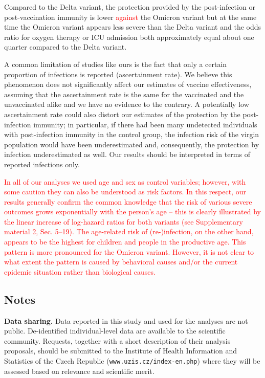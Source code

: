 \documentclass[a4paper,12pt]{article}
\newcommand{\new}[1]{\textcolor{red}{#1}}
\begin{document}
Compared to the Delta variant, the protection provided by the post-infection or post-vaccination immunity is lower \new{against} the Omicron variant but at the same time the Omicron variant appears less severe than the Delta variant and the odds ratio for oxygen therapy or ICU admission both approximately equal about one quarter compared to the Delta variant.

A common limitation of studies like ours is the fact that only a certain proportion of infections is reported (ascertainment rate). We believe this phenomenon does not  significantly affect our estimates of vaccine effectiveness, assuming that the ascertainment rate is the same for the vaccinated and the unvaccinated alike and we have no evidence to the contrary. A potentially low ascertainment rate could also distort our estimates of the protection by the post-infection immunity; in particular, if there had been many undetected individuals with post-infection immunity in the control group, the infection risk of the virgin population would have been underestimated and, consequently, the protection by infection underestimated as well. Our results should be interpreted in terms of reported infections only. 

\new{In all of our analyses we used age and sex as control variables; however, with some caution they can  also be understood as risk factors. In this respect, our results generally confirm the common knowledge that the risk of various severe outcomes grows exponentially with the person's age -- this is clearly illustrated by the linear increase of log-hazard ratios for both variants (see Supplementary material 2, Sec. 5--19). The age-related risk of (re-)infection, on the other hand, appears to be the highest for children and people in the productive age. This pattern is more pronounced for the Omicron variant. However, it is not clear to what extent  the pattern is caused by behavioral causes and/or the current epidemic situation rather than biological causes.}


\subsection*{Notes}

{\bf Data sharing.} 
Data reported in this study and used for the analyses are not public. De-identified individual-level data are available to the scientific community. Requests, together with a short description of their analysis proposals, should be submitted to the Institute of Health Information and Statistics of the Czech Republic  ({\tt www.uzis.cz/index-en.php}) where they will be assessed based on relevance and scientific merit.
\end{document}
